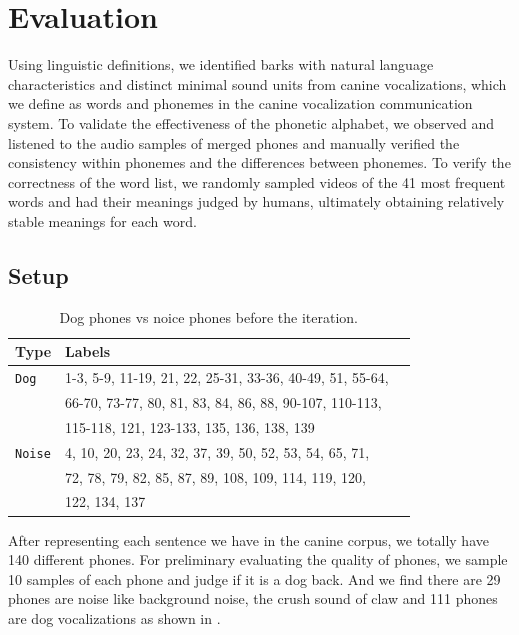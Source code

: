 \section{Evaluation}
\label{sec:results}

Using linguistic definitions, we identified barks with natural language characteristics and distinct minimal sound units from canine vocalizations, which we define as words and phonemes in the canine vocalization communication system. To validate the effectiveness of the phonetic alphabet, we observed and listened to the audio samples of merged phones and manually verified the consistency within phonemes and the differences between phonemes. To verify the correctness of the word list, we randomly sampled videos of the 41 most frequent words and had their meanings judged by humans, ultimately obtaining relatively stable meanings for each word.

\subsection{Setup}

\begin{table}[th]
\centering
\small
\begin{tabular}{lll}
\hline
\textbf{Type} & \textbf{Labels}\\
\hline
\verb|Dog| & 1-3, 5-9, 11-19, 21, 22, 25-31, 33-36, 40-49, 51, 55-64, \\
& 66-70, 73-77, 80, 81, 83, 84, 86, 88, 90-107, 110-113, \\
& 115-118, 121, 123-133, 135, 136, 138, 139 \\
\verb|Noise| & 4, 10, 20, 23, 24, 32, 37, 39, 50, 52, 53, 54, 65, 71, \\
& 72, 78, 79, 82, 85, 87, 89, 108, 109, 114, 119, 120, \\
& 122, 134, 137 \\\hline
\end{tabular}
\caption{Dog phones vs noice phones before the iteration.}
\label{tab:phoneclassification}
\end{table}

After representing each sentence we have in the canine corpus, we totally have 140 different phones. For preliminary evaluating the quality of phones, we sample 10 samples of each phone and judge if it is a dog back. And we find there are 29 phones are noise like background noise, the crush sound of claw and 111 phones are dog vocalizations as shown in . 

